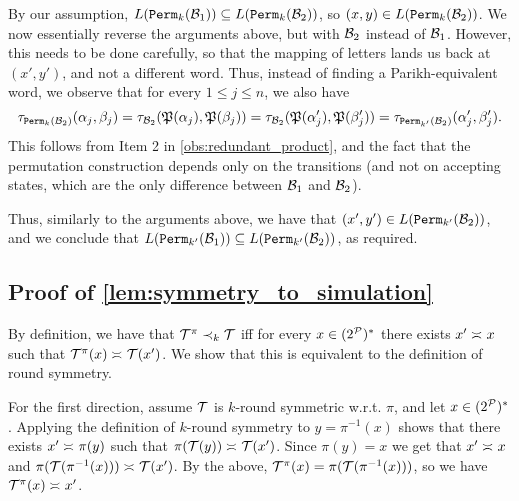 	By our assumption, $L({\mathtt{Perm}}_{k}(\mathcal{B}_1))\subseteq L({\mathtt{Perm}}_{k}(\mathcal{B}_2))$, so $(x,y)\in L({\mathtt{Perm}}_{k}(\mathcal{B}_2))$.
	We now essentially reverse the arguments above, but with $\mathcal{B}_2$ instead of $\mathcal{B}_1$. However, this needs to be done carefully, so that the mapping of letters lands us back at $(x',y')$, and not a different word.
    Thus, instead of finding a Parikh-equivalent word, we observe that for every $1\le j\le n$, we also have 
	\[\tau_{{\mathtt{Perm}}_k(\mathcal{B}_2)}(\alpha_j,\beta_j)=\tau_{\mathcal{B}_2}(\mathfrak{P}(\alpha_j),\mathfrak{P}(\beta_j))=\tau_{\mathcal{B}_2}(\mathfrak{P}(\alpha'_j),\mathfrak{P}(\beta'_j))=\tau_{{\mathtt{Perm}}_{k'}(\mathcal{B}_2)}(\alpha'_j,\beta'_j).\]
	This follows from Item 2 in \autoref{obs:redundant_product}, and the fact that the permutation construction depends only on the transitions (and not on accepting states, which are the only difference between $\mathcal{B}_1$ and $\mathcal{B}_2$).
	
	Thus, similarly to the arguments above, we have that $(x',y')\in L({\mathtt{Perm}}_{k'}(\mathcal{B}_2))$, and we conclude that $L({\mathtt{Perm}}_{k'}(\mathcal{B}_1))\subseteq L({\mathtt{Perm}}_{k'}(\mathcal{B}_2))$, as required.

\subsection{Proof of \autoref{lem:symmetry_to_simulation}}
\label{apx:symmetry_to_simulation}
    By definition, we have that $\mathcal{T}^{\pi}\prec_{k} \mathcal{T}$ iff for every $x\in (2^{\mathcal{P}})^*$ there exists $x'\asymp_{} x$ such that $\mathcal{T}^{\pi}(x)\asymp_{} \mathcal{T}(x')$. We show that this is equivalent to the definition of round symmetry.
    
    For the first direction, assume $\mathcal{T}$ is $k$-round symmetric w.r.t.\! $\pi$, and let $x\in (2^{\mathcal{P}})^*$. Applying the definition of $k$-round symmetry to $y=\pi^{-1}(x)$ shows that there exists $x'\asymp_{} \pi(y)$ such that $\pi(\mathcal{T}(y))\asymp_{} \mathcal{T}(x')$. Since $\pi(y)=x$ we get that $x'\asymp_{} x$ and $\pi(\mathcal{T}(\pi^{-1}(x)))\asymp_{} \mathcal{T}(x')$. By the above, $\mathcal{T}^\pi(x) = \pi(\mathcal{T}(\pi^{-1}(x)))$, so we have $\mathcal{T}^{\pi}(x)\asymp_{} x'$.
    
